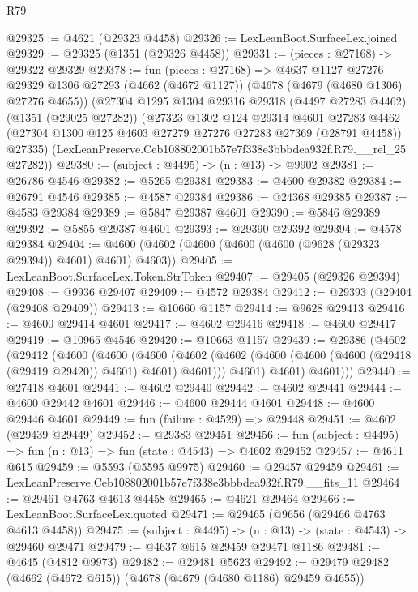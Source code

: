 \begin{lexlean}{R79}
\begin{coremodule}
@29325 := @4621 (@29323 @4458)
@29326 := LexLeanBoot.SurfaceLex.joined
@29329 := @29325 (@1351 (@29326 @4458))
@29331 := (pieces : @27168) -> @29322 @29329
@29378 := fun (pieces : @27168) =>
  @4637
    @1127
    @27276
    @29329
    @1306
    @27293
    (@4662 (@4672 @1127))
    (@4678 (@4679 (@4680 @1306) @27276 @4655))
    (@27304
      @1295
      @1304
      @29316
      @29318
      (@4497 @27283 @4462)
      (@1351 (@29025 @27282))
      (@27323
        @1302
        @124
        @29314
        @4601
        @27283
        @4462
        (@27304 @1300 @125 @4603 @27279 @27276 @27283 @27369 (@28791 @4458))
        @27335)
      (LexLeanPreserve.Ceb108802001b57e7f338e3bbbdea932f.R79.__rel_25 @27282))
@29380 := (subject : @4495) -> (n : @13) -> @9902
@29381 := @26786 @4546
@29382 := @5265 @29381
@29383 := @4600 @29382
@29384 := @26791 @4546
@29385 := @4587 @29384
@29386 := @24368 @29385
@29387 := @4583 @29384
@29389 := @5847 @29387 @4601
@29390 := @5846 @29389
@29392 := @5855 @29387 @4601
@29393 := @29390 @29392
@29394 := @4578 @29384
@29404 := @4600 (@4602 (@4600 (@4600 (@4600 (@9628 (@29323 @29394)) @4601) @4601) @4603))
@29405 := LexLeanBoot.SurfaceLex.Token.StrToken
@29407 := @29405 (@29326 @29394)
@29408 := @9936 @29407
@29409 := @4572 @29384
@29412 := @29393 (@29404 (@29408 @29409))
@29413 := @10660 @1157
@29414 := @9628 @29413
@29416 := @4600 @29414 @4601
@29417 := @4602 @29416
@29418 := @4600 @29417
@29419 := @10965 @4546
@29420 := @10663 @1157
@29439 := @29386
    (@4602
      (@29412
        (@4600
          (@4600
            (@4600
              (@4602 (@4602 (@4600 (@4600 (@4600 (@29418 (@29419 @29420)) @4601) @4601) @4601)))
              @4601)
            @4601)
          @4601)))
@29440 := @27418 @4601
@29441 := @4602 @29440
@29442 := @4602 @29441
@29444 := @4600 @29442 @4601
@29446 := @4600 @29444 @4601
@29448 := @4600 @29446 @4601
@29449 := fun (failure : @4529) => @29448
@29451 := @4602 (@29439 @29449)
@29452 := @29383 @29451
@29456 := fun (subject : @4495) => fun (n : @13) => fun (state : @4543) => @4602 @29452
@29457 := @4611 @615
@29459 := @5593 (@5595 @9975)
@29460 := @29457 @29459
@29461 := LexLeanPreserve.Ceb108802001b57e7f338e3bbbdea932f.R79.__fits_11
@29464 := @29461 @4763 @4613 @4458
@29465 := @4621 @29464
@29466 := LexLeanBoot.SurfaceLex.quoted
@29471 := @29465 (@9656 (@29466 @4763 @4613 @4458))
@29475 := (subject : @4495) -> (n : @13) -> (state : @4543) -> @29460 @29471
@29479 := @4637 @615 @29459 @29471 @1186
@29481 := @4645 (@4812 @9973)
@29482 := @29481 @5623
@29492 := @29479 @29482 (@4662 (@4672 @615)) (@4678 (@4679 (@4680 @1186) @29459 @4655))

\end{coremodule}
\end{lexlean}
